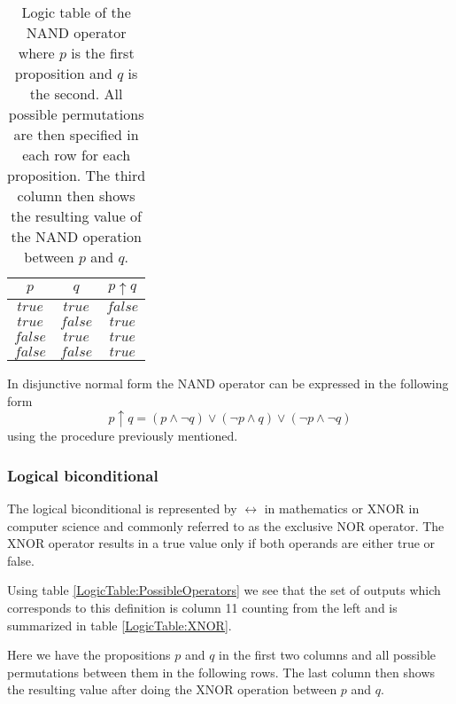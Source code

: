                 \begin{table}[h!]
                    \centering
                    \begin{tabular}{|c|c|c|}
                    	\hline
                    	  $p$   &   $q$   & $p \uparrow q$ \\ \hline
                    	$true$  & $true$  &    $false$     \\ \hline
                    	$true$  & $false$ &     $true$     \\ \hline
                    	$false$ & $true$  &     $true$     \\ \hline
                    	$false$ & $false$ &     $true$     \\ \hline
                    \end{tabular}
                    \caption{Logic table of the NAND operator where $p$ is the first proposition and $q$ is the second. All possible permutations are then specified in each row for each proposition. The third column then shows the resulting value of the NAND operation between $p$ and $q$.}
                    \label{LogicTable:NAND}
                \end{table}
            
                In disjunctive normal form the NAND operator can be expressed in the following form
                \begin{equation}
                p \uparrow q = (p \wedge \neg q) \vee (\neg p \wedge q) \vee (\neg p \wedge \neg q)
                \end{equation}
                using the procedure previously mentioned.
                
            \subsubsection{Logical biconditional}
               The logical biconditional is represented by $\leftrightarrow$ in mathematics or XNOR in computer science and commonly referred to as the exclusive NOR operator. The XNOR operator results in a true value only if both operands are either true or false.
               
               Using table \ref{LogicTable:PossibleOperators} we see that the set of outputs which corresponds to this definition is column 11 counting from the left and is summarized in table \ref{LogicTable:XNOR}.
               
               Here we have the propositions $p$ and $q$ in the first two columns and all possible permutations between them in the following rows. The last column then shows the resulting value after doing the XNOR operation between $p$ and $q$.
               
